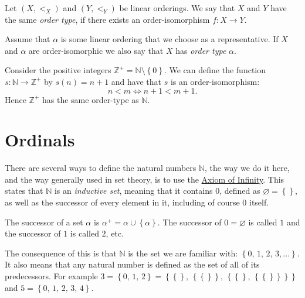 \documentclass[../../main.tex]{subfiles}
\begin{document}
\begin{definition}\cite[Definition 1.12, 1.13]{Ros82}
    Let $(X, <_X)$ and $(Y, <_Y)$ be linear orderings.
    We say that $X$ and $Y$ have the same \textit{order type}, if there exists an order-isomorphism $f: X \to Y$.

    Assume that $\alpha$ is some linear ordering that we choose as a representative.
    If $X$ and $\alpha$ are order-isomorphic we also say that $X$ has \textit{order type} $\alpha$.
\end{definition}

\begin{example}
    Consider the positive integers $\mathbb{Z}^+ = \mathbb{N} \setminus \left\{0\right\}$.
    We can define the function $s: \mathbb{N} \to \mathbb{Z^+}$ by $s(n) = n + 1$ and have that $s$ is an order-isomorphism:
    $$n < m \iff n+1 < m+1.$$
    Hence $\mathbb{Z}^+$ has the same order-type as $\mathbb{N}$.
\end{example}


\section{Ordinals}\label{ordinals-section}
There are several ways to define the natural numbers $\mathbb{N}$, the way we do it here, and the way generally used in set theory, is to use the \hyperref[ZF7]{Axiom of Infinity}.
This states that $\mathbb{N}$ is an \textit{inductive set}, meaning that it contains $0$, defined as $\varnothing = \left\{\right\}$, as well as the successor of every element in it, including of course $0$ itself. \cite[p.39]{Gol17}

\begin{definition}\cite[p.38]{Gol17}
    The successor of a set $\alpha$ is $\alpha^+ = \alpha \cup \left\{\alpha\right\}$.
    The successor of $0 = \varnothing$ is called $1$ and the successor of $1$ is called $2$, etc.
\end{definition}

The consequence of this is that $\mathbb{N}$ is the set we are familiar with: $\left\{0,\, 1,\, 2,\, 3,\ldots\right\}$.
It also means that any natural number is defined as the set of all of its predecessors.
For example $3 = \left\{0,\, 1,\, 2\right\} = \left\{\left\{\right\},\, \left\{\left\{\right\}\right\},\, \left\{\left\{\right\},\, \left\{\left\{\right\}\right\}\right\}\right\}$ and $5 = \left\{0,\, 1,\, 2,\, 3,\, 4\right\}$.
\end{document}
